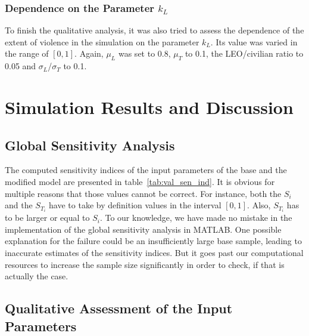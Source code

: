 \documentclass[11pt]{article}
\begin{document}
\subsubsection{Dependence on the Parameter $k_L$}
To finish the qualitative analysis, it was also tried to assess the dependence of the extent of violence in the simulation on the parameter $k_L$. Its value was varied in the range of $[0,1]$. Again, $\mu_L$ was set to 0.8, $\mu_T$ to 0.1, the LEO/civilian ratio to 0.05 and $\sigma_L$/$\sigma_T$ to 0.1.

\section{Simulation Results and Discussion}

\subsection{Global Sensitivity Analysis}
The computed sensitivity indices of the input parameters of the base and the modified model are presented in table~\ref{tab:val_sen_ind}. It is obvious for multiple reasons that those values cannot be correct. For instance, both the $S_i$ and the $S_{T_i}$ have to take by definition values in the interval $[0,1]$. Also, $S_{T_i}$ has to be larger or equal to $S_i$. To our knowledge, we have made no mistake in the implementation of the global sensitivity analysis in MATLAB. One possible explanation for the failure could be an insufficiently large base sample, leading to inaccurate estimates of the sensitivity indices. But it goes past our computational resources to increase the sample size significantly in order to check, if that is actually the case.

\subsection{Qualitative Assessment of the Input Parameters}
\end{document}
